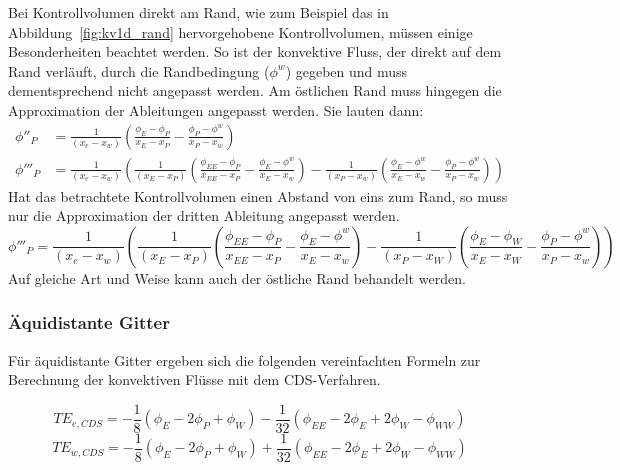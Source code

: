 Bei Kontrollvolumen direkt am Rand, wie zum Beispiel das in Abbildung~\ref{fig:kv1d_rand}
hervorgehobene Kontrollvolumen, müssen einige Besonderheiten beachtet werden.
So ist der konvektive Fluss, der direkt auf dem Rand verläuft, durch die Randbedingung ($\phi^w$) gegeben und
muss dementsprechend nicht angepasst werden. Am östlichen Rand muss hingegen die Approximation
der Ableitungen angepasst werden. Sie lauten dann:
\begin{align*}
  \phi''_P &= \frac{1}{(x_e-x_w)} \left({\frac{\phi_E-\phi_P}{x_E-x_P}
  - \frac{\phi_P-\phi^w}{x_P-x_w} }\right)\\
  \phi'''_P &= \frac{1}{(x_e-x_w)} \left({
  \frac{1}{(x_E-x_P)} \left({\frac{\phi_{EE}-\phi_P}{x_{EE}-x_P}- \frac{\phi_E-\phi^w}{x_E-x_w} }\right)-
  \frac{1}{(x_P-x_w)} \left({\frac{\phi_E-\phi^w}{x_E-x_w} - \frac{\phi_P-\phi^{w}}{x_P-x_{w}} }\right)
  }\right)
\end{align*}
Hat das betrachtete Kontrollvolumen  einen Abstand von eins zum Rand, so muss nur die Approximation der dritten
Ableitung angepasst werden.
\begin{equation*}
  \phi'''_P = \frac{1}{(x_e-x_w)} \left({
  \frac{1}{(x_E-x_P)} \left({\frac{\phi_{EE}-\phi_P}{x_{EE}-x_P}- \frac{\phi_E-\phi^w}{x_E-x_w} }\right)-
  \frac{1}{(x_P-x_W)} \left({\frac{\phi_E-\phi_W}{x_E-x_W} - \frac{\phi_P-\phi^{w}}{x_P-x_{w}} }\right)
  }\right)
\end{equation*}
Auf gleiche Art und Weise kann auch der östliche Rand behandelt werden.


\subsubsection{Äquidistante Gitter}

Für äquidistante Gitter ergeben sich die folgenden vereinfachten Formeln zur Berechnung der konvektiven Flüsse
mit dem CDS-Verfahren.

\begin{equation*}
  TE_{e, CDS} = -\frac{1}{8} (\phi_E-2\phi_P+\phi_W) - \frac{1}{32}
  (\phi_{EE} - 2\phi_E + 2\phi_W - \phi_{WW})
\end{equation*}
\begin{equation*}
  TE_{w, CDS} = -\frac{1}{8} (\phi_E-2\phi_P+\phi_W) + \frac{1}{32}
  (\phi_{EE} - 2\phi_E + 2\phi_W - \phi_{WW})
\end{equation*}








